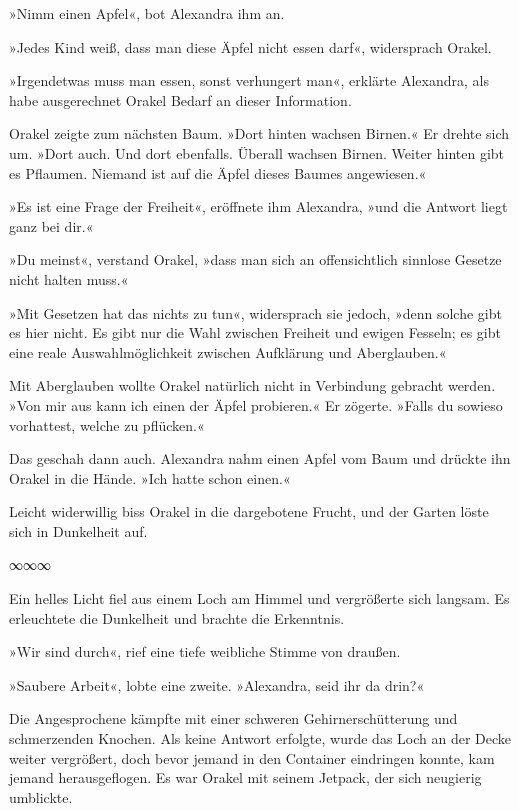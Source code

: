 »Nimm einen Apfel«, bot Alexandra ihm an.

»Jedes Kind weiß, dass man diese Äpfel nicht essen darf«, widersprach Orakel.

»Irgendetwas muss man essen, sonst verhungert man«, erklärte Alexandra, als habe ausgerechnet Orakel Bedarf an dieser Information.

Orakel zeigte zum nächsten Baum. »Dort hinten wachsen Birnen.« Er drehte sich um. »Dort auch. Und dort ebenfalls. Überall wachsen Birnen. Weiter hinten gibt es Pflaumen. Niemand ist auf die Äpfel dieses Baumes angewiesen.«

»Es ist eine Frage der Freiheit«, eröffnete ihm Alexandra, »und die Antwort liegt ganz bei dir.«

»Du meinst«, verstand Orakel, »dass man sich an offensichtlich sinnlose Gesetze nicht halten muss.«

»Mit Gesetzen hat das nichts zu tun«, widersprach sie jedoch, »denn solche gibt es hier nicht. Es gibt nur die Wahl zwischen Freiheit und ewigen Fesseln; es gibt eine reale Auswahlmöglichkeit zwischen Aufklärung und Aberglauben.«

Mit Aberglauben wollte Orakel natürlich nicht in Verbindung gebracht werden. »Von mir aus kann ich einen der Äpfel probieren.« Er zögerte. »Falls du sowieso vorhattest, welche zu pflücken.«

Das geschah dann auch. Alexandra nahm einen Apfel vom Baum und drückte ihn Orakel in die Hände. »Ich hatte schon einen.«

Leicht widerwillig biss Orakel in die dargebotene Frucht, und der Garten löste sich in Dunkelheit auf.

\begin{center}
∞∞∞
\end{center}

Ein helles Licht fiel aus einem Loch am Himmel und vergrößerte sich langsam. Es erleuchtete die Dunkelheit und brachte die Erkenntnis.

»Wir sind durch«, rief eine tiefe weibliche Stimme von draußen.

»Saubere Arbeit«, lobte eine zweite. »Alexandra, seid ihr da drin?«

Die Angesprochene kämpfte mit einer schweren Gehirnerschütterung und schmerzenden Knochen. Als keine Antwort erfolgte, wurde das Loch an der Decke weiter vergrößert, doch bevor jemand in den Container eindringen konnte, kam jemand herausgeflogen. Es war Orakel mit seinem Jetpack, der sich neugierig umblickte.

